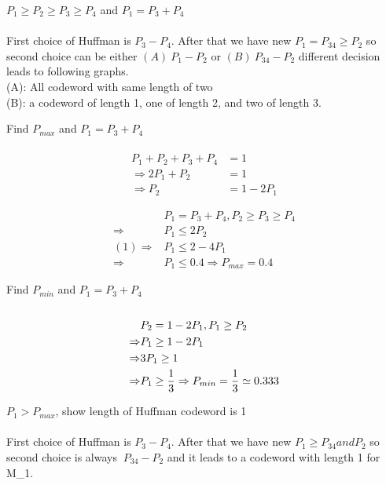 \documentclass[
  course = {{EE623 Information Theory}},
  quartile = {{3}},
  assignment = 3,
  name = {{Mohammad Mahdi Rahimi}},
  studentnumber = {{20208244}},
  email = {{mahi@kaist.ac.kr}},
  firstexercise = 1
]{aga-homework}
\begin{document}
\exercise

\subexercise $P_1 \ge P_2 \ge P_3 \ge P_4$ and $P_1 = P_3 + P_4$
\\\\
First choice of Huffman is $P_3 - P_4$. After that we have new $P_1 = P_{34} \ge P_2$ so second choice can be either $(A)\ P_1 - P_2$ or $(B)\ P_{34} - P_2$ different decision leads to following graphs.
\\
(A): All codeword with same length of two\\
(B): a codeword of length 1, one of length 2, and two of length 3.

\subexercise Find $P_{max}$ and $P_1 = P_3 + P_4$
\\\\
\begin{equation} \label{eq3}
\begin{split}
P_1 + P_2 + P_3 + P_4  & = 1\\
\Rightarrow  2P_1 + P_2 & = 1\\
\Rightarrow  P_2 & = 1 - 2P_1
\end{split}
\end{equation}

\begin{equation} \label{eq3}
\begin{split}
& P_1 = P_3 + P_4, P_2 \ge P_3 \ge P_4\\
\Rightarrow & P_1 \le 2P_2\\
(1) \Rightarrow & P_1 \le 2 - 4P_1\\
\Rightarrow & P_1 \le 0.4 \Rightarrow P_{max} = 0.4
\end{split}
\end{equation}

\subexercise Find $P_{min}$ and $P_1 = P_3 + P_4$
\\\\
\begin{equation} \label{eq3}
\begin{split}
& P_2 = 1 - 2P_1, P_1 \ge P_2\\
\Rightarrow & P_1 \ge 1 - 2P_1\\
\Rightarrow & 3P_1 \ge 1\\
\Rightarrow & P_1 \ge {1 \over 3} \Rightarrow P_{min} = {1 \over 3} \simeq 0.333
\end{split}
\end{equation}

\subexercise $P_{1} > P_{max}$, show length of Huffman codeword is 1 
\\\\
First choice of Huffman is $P_3 - P_4$. After that we have new $P_1 \ge P_{34} and P_2$ so second choice is always $\ P_{34} - P_2$ and it leads to a codeword with length 1 for M_1.
\end{document}
